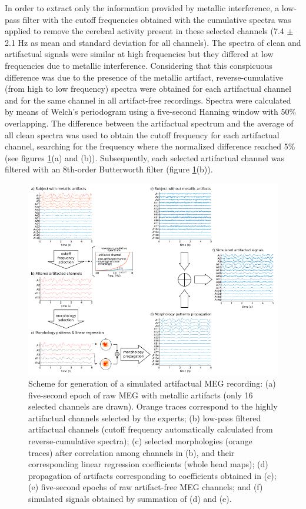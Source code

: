 In order to extract only the information provided by metallic interference, a low-pass filter with the cutoff frequencies obtained with the cumulative spectra was applied to remove the cerebral activity present in these selected channels (7.4 $\pm$ 2.1 Hz as mean and standard deviation for all channels). The spectra of clean and artifactual signals were similar at high frequencies but they differed at low frequencies due to metallic interference. Considering that this conspicuous difference was due to the presence of the metallic artifact, reverse-cumulative (from high to low frequency) spectra were obtained for each artifactual channel and for the same channel in all artifact-free recordings. Spectra were calculated by means of Welch's periodogram using a five-second Hanning window with 50\% overlapping. The difference between the artifactual spectrum and the average of all clean spectra was used to obtain the cutoff frequency for each artifactual channel, searching for the frequency where the normalized difference reached 5\% (see figures \ref{fig:1-1}(a) and (b)). Subsequently, each selected artifactual channel was filtered with an 8th-order Butterworth filter (figure \ref{fig:1-1}(b)).

\begin{figure}[ht]
\centering
\includegraphics[width=1\textwidth]{Images/fig1-1.png}
\caption{Scheme for generation of a simulated artifactual MEG recording: (a) five-second epoch of raw MEG with metallic artifacts (only 16 selected channels are drawn). Orange traces correspond to the highly artifactual channels selected by the experts; (b) low-pass filtered artifactual channels (cutoff frequency automatically calculated from reverse-cumulative spectra); (c) selected morphologies (orange traces) after correlation among channels in (b), and their corresponding linear regression coefficients (whole head maps); (d) propagation of artifacts corresponding to coefficients obtained in (c); (e) five-second epochs of raw artifact-free MEG channels; and (f) simulated signals obtained by summation of (d) and (e).}
\label{fig:1-1}
\end{figure}      

